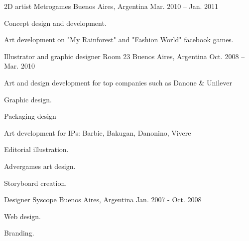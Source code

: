 \begin{cventries}
  \cventry
    {2D artist} %
    {Metrogames} %
    {Buenos Aires, Argentina} %
    {Mar. 2010 – Jan. 2011} %
    {
      \begin{cvitems} %
        \item {Concept design and development.}
        \item {Art development on "My Rainforest" and "Fashion World" facebook games.}
      \end{cvitems}
    }
  \cventry
    {Illustrator and graphic designer} %
    {Room 23} %
    {Buenos Aires, Argentina} %
    {Oct. 2008 – Mar. 2010} %
    {
      \begin{cvitems} %
        \item {Art and design development for top companies such as Danone \& Unilever}
        \item {Graphic design.}
        \item {Packaging design}
        \item {Art development for IPs: Barbie, Bakugan, Danonino, Vivere}
        \item {Editorial illustration.}
        \item {Advergames art design.}
        \item {Storyboard creation.}
      \end{cvitems}
    }
  \cventry
    {Designer} %
    {Syscope} %
    {Buenos Aires, Argentina} %
    {Jan. 2007 - Oct. 2008} %
    {
      \begin{cvitems} %
        \item {Web design.}
        \item {Branding.}
      \end{cvitems}
    }
\end{cventries}
